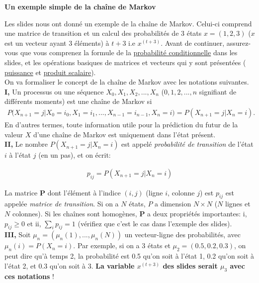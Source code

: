 \begin{Exercice}[15 minutes]\textbf{Un exemple simple de la chaîne de Markov}

Les slides nous ont donné un exemple de la chaîne de Markov. Celui-ci comprend une matrice de transition et un calcul des probabilités de  3 états $x=(1,2,3)$ ($x$ est un vecteur ayant 3 éléments) à $t+3$  i.e $x^{(t+3)}$. Avant de continuer, assurez-vous que vous comprenez la formule de la \href{https://fr.wikipedia.org/wiki/Probabilit\%C3\%A9_conditionnelle}{\color{cyan} probabilité conditionnelle} dans les slides, et les opérations basiques de matrices et vecteurs qui y sont présentées (\href{https://fr.wikiversity.org/wiki/Initiation_aux_matrices/Puissance_d\%27une_matrice}{\color{cyan} puissance} et \href{https://fr.wikipedia.org/wiki/Produit_scalaire}{\color{cyan} produit scalaire}).\\


On va formaliser le concept de la chaîne de Markov avec les notations suivantes.\\

\textbf{I,} Un processus ou une séquence $X_0, X_1, X_2, ..., X_n$ ($0,1,2,...,n$ signifiant de différents moments) est une chaîne de Markov si
\begin{align} 
P\Big(X_{n+1}=j | X_0=i_0, X_1=i_1, ... , X_{n-1}=i_{n-1},X_n=i\Big) = P\left(X_{n+1}=j | X_n=i\right).
\end{align}
En d'autres termes, toute information utile pour la prédiction du futur de la valeur $X$ d'une chaîne de Markov est uniquement dans l'état présent.\\
 
\textbf{II,} Le nombre $P\left(X_{n+1}=j | X_n=i\right)$ est appelé \textit{probabilité de transition} de l'état $i$ à l'état $j$ (en un pas), et on écrit:

\begin{align}
p_{ij} = P\left(X_{n+1}=j | X_n=i\right)
\end{align}

La matrice $\mathbf{P}$ dont l'élément à l'indice $(i,j)$ (ligne $i$, colonne $j$) est $p_{ij}$ est appelée \textit{matrice de transition}. Si on a $N$ états, $P$ a dimension $N \times N$ ($N$ lignes et $N$ colonnes). Si les chaînes sont homogènes, $\mathbf{P}$ a deux propriétés importantes: i, $p_{ij} \geq 0$ et ii, $\sum_i p_{ij} = 1$ (vérifiez que c'est le cas dans l'exemple des slides).\\

\textbf{III,} Soit $\mu_n = (\mu_n(1), ..., \mu_n(N))$ un vecteur-ligne des probabilités, avec $\mu_n(i) = P(X_n=i)$. Par exemple, si on a 3 états et $\mu_2 = (0.5, 0.2, 0.3)$, on peut dire qu'à temps 2, la probabilité est 0.5 qu'on soit à l'état 1, 0.2 qu'on soit à l'état 2, et 0.3 qu'on soit à 3. \textbf{La variable $x^{(t+3)}$ des slides serait $\mu_3$ avec ces notations} !\\


\end{Exercice}
